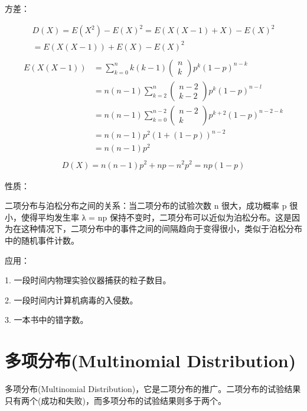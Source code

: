 \documentclass[12pt, a4paper, oneside]{ctexbook}
\begin{document}
 方差：

\begin{align*}
D(X) = E(X^{2}) - E(X)^{2} =E(X(X-1)+X) - E(X)^{2} \\
=E(X(X-1)) + E(X) - E(X)^{2} \quad \quad \quad \quad  \\
\end{align*}
\begin{align*}
    E(X(X-1)) &= \sum\limits_{k = 0}^{n}k(k - 1)\begin{pmatrix} n \\ k\end{pmatrix} p^{k}(1-p)^{n - k}  \\ &= n(n - 1)\sum\limits_{k = 2}^{n} \begin{pmatrix} n - 2\\ k - 2\end{pmatrix} p^{k}(1 - p)^{n - l}  \\
&= n(n - 1)\sum\limits_{k = 0}^{n - 2}\begin{pmatrix} n - 2 \\ k \end{pmatrix} p^{k + 2}(1-p)^{n - 2 - k} \\
&= n(n - 1) p^{2} (1 + (1 - p))^{n - 2}  \\
&= n(n - 1)p^{2} \\
\end{align*}
\begin{align*}
    D(X) = n(n -1)p^{2} + np - n^{2}p^{2}  = np(1-p) 
\end{align*}


 性质：
 
二项分布与泊松分布之间的关系：当二项分布的试验次数 n 很大，成功概率 p 很小，使得平均发生率 λ = np 保持不变时，二项分布可以近似为泊松分布。这是因为在这种情况下，二项分布中的事件之间的间隔趋向于变得很小，类似于泊松分布中的随机事件计数。

 应用：
 
1. 一段时间内物理实验仪器捕获的粒子数目。

2. 一段时间内计算机病毒的入侵数。

3. 一本书中的错字数。

\section{多项分布(Multinomial Distribution)}

多项分布(Multinomial Distribution)，它是二项分布的推广。二项分布的试验结果只有两个(成功和失败)，而多项分布的试验结果则多于两个。
\end{document}
